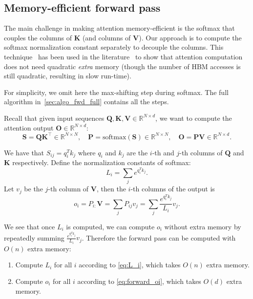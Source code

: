 \documentclass{article}
\newcommand{\softmax}{\mathrm{softmax}}
\newcommand{\vQ}{\mathbf{Q}}
\newcommand{\vK}{\mathbf{K}}
\newcommand{\vV}{\mathbf{V}}
\newcommand{\vS}{\mathbf{S}}
\newcommand{\vP}{\mathbf{P}}
\newcommand{\vO}{\mathbf{O}}
\begin{document}
\subsection{Memory-efficient forward pass}
\label{sec:forward}

The main challenge in making attention memory-efficient is the softmax that
couples the columns of $\vK$ (and columns of $\vV$).
Our approach is to compute the softmax normalization constant separately to
decouple the columns.
This technique~\citep{milakov2018online} has been used in the
literature~\citep{kitaev2020reformer,rabe2021self} to show that attention
computation does not need quadratic \emph{extra} memory (though the number of
HBM accesses is still quadratic, resulting in slow run-time).

For simplicity, we omit here the max-shifting step during softmax.
The full algorithm in~\cref{sec:algo_fwd_full} contains all the steps.

Recall that given input sequences $\vQ, \vK, \vV \in \mathbb{R}^{N \times d}$, we want to
compute the attention output $\vO \in \mathbb{R}^{N \times d}$:
\begin{equation*}
  \vS = \vQ \vK^\top \in \mathbb{R}^{N \times N}, \quad \vP = \softmax(\vS) \in \mathbb{R}^{N \times N}, \quad \vO = \vP\vV \in \mathbb{R}^{N \times d}.
\end{equation*}

We have that $S_{ij} = q_i^T k_j$ where $q_i$ and $k_j$ are the $i$-th and
$j$-th columns of $\vQ$ and $\vK$ respectively.
Define the normalization constants of softmax:
\begin{equation}
  \label{eq:L_i}
  L_i = \sum_{j} e^{q_i^T k_j}.
\end{equation}
Let $v_j$ be the $j$-th column of $\vV$, then the $i$-th columns of the output is
\begin{equation}
  \label{eq:forward_oi}
  o_i = P_{i:} \vV = \sum_{j} P_{ij} v_j = \sum_{j} \frac{e^{q_i^T k_j}}{L_i} v_j.
\end{equation}

We see that once $L_i$ is computed, we can compute $o_i$ without extra memory
by repeatedly summing $\frac{e^{q_i^T k_j}}{L_i} v_j$.
Therefore the forward pass can be computed with $O(n)$ extra memory:
\begin{enumerate}
  \item Compute $L_i$ for all $i$ according to \cref{eq:L_i}, which takes $O(n)$
  extra memory.
  \item Compute $o_i$ for all $i$ according to \cref{eq:forward_oi}, which takes
  $O(d)$ extra memory.
\end{enumerate}
\end{document}
